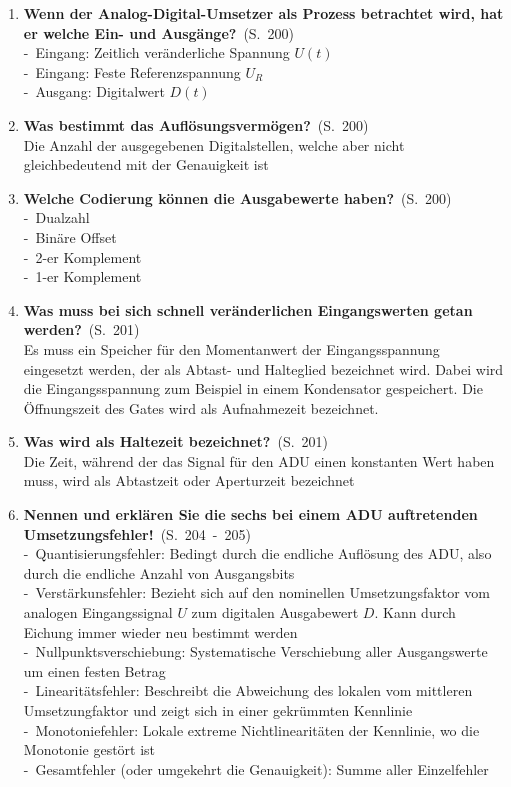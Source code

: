 \documentclass[a4paper,12pt]{article}
\newcommand{\question}[3]{\pagebreak[3]\item {\textbf{#1?}}\ (S.\ #2)#3}
\newcommand{\statement}[3]{\pagebreak[3]\item {\textbf{#1!}}\ (S.\ #2)#3}
\newcommand{\catchword}[1]{\\-\ #1}
\newcommand{\normaltext}[1]{\\#1}
\newcommand{\page}[1]{#1}
\newcommand{\pages}[2]{#1\ -\ #2}
\begin{document}
\begin{enumerate}
  \question{Wenn der Analog-Digital-Umsetzer als Prozess betrachtet wird, hat er welche Ein-
            und Ausgänge}{\page{200}}
  {
    \catchword{Eingang: Zeitlich veränderliche Spannung $U(t)$}
    \catchword{Eingang: Feste Referenzspannung $U_R$}
    \catchword{Ausgang: Digitalwert $D(t)$}
  }

  \question{Was bestimmt das Auflösungsvermögen}{\page{200}}
  {
    \normaltext{Die Anzahl der ausgegebenen Digitalstellen, welche aber nicht gleichbedeutend
                mit der Genauigkeit ist}
  }

  \question{Welche Codierung können die Ausgabewerte haben}{\page{200}}
  {
    \catchword{Dualzahl}
    \catchword{Binäre Offset}
    \catchword{2-er Komplement}
    \catchword{1-er Komplement}
  }

  \question{Was muss bei sich schnell veränderlichen Eingangswerten getan werden}{\page{201}}
  {
    \normaltext{Es muss ein Speicher für den Momentanwert der Eingangsspannung eingesetzt werden,
                der als Abtast- und Halteglied bezeichnet wird. Dabei wird die Eingangsspannung
                zum Beispiel in einem Kondensator gespeichert. Die Öffnungszeit des Gates wird
                als Aufnahmezeit bezeichnet.}
  }

  \question{Was wird als Haltezeit bezeichnet}{\page{201}}
  {
    \normaltext{Die Zeit, während der das Signal für den ADU einen konstanten Wert haben muss,
                wird als Abtastzeit oder Aperturzeit bezeichnet}
  }

  \statement{Nennen und erklären Sie die sechs bei einem ADU auftretenden
             Umsetzungsfehler}{\pages{204}{205}}
  {
    \catchword{Quantisierungsfehler: Bedingt durch die endliche Auflösung des ADU, also durch
               die endliche Anzahl von Ausgangsbits}
    \catchword{Verstärkunsfehler: Bezieht sich auf den nominellen Umsetzungsfaktor vom analogen
               Eingangssignal $U$ zum digitalen Ausgabewert $D$. Kann durch Eichung immer wieder
               neu bestimmt werden}
    \catchword{Nullpunktsverschiebung: Systematische Verschiebung aller Ausgangswerte um einen
               festen Betrag}
    \catchword{Linearitätsfehler: Beschreibt die Abweichung des lokalen vom mittleren Umsetzungfaktor
               und zeigt sich in einer gekrümmten Kennlinie}
    \catchword{Monotoniefehler: Lokale extreme Nichtlinearitäten der Kennlinie, wo die Monotonie
               gestört ist}
    \catchword{Gesamtfehler (oder umgekehrt die Genauigkeit): Summe aller Einzelfehler}
  }


\end{enumerate}
\end{document}
